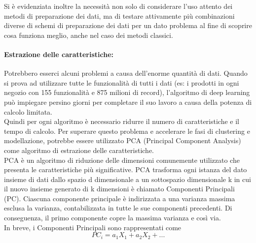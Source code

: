 \documentclass[12pt,a4paper]{report}
\begin{document}
Si è evidenziata inoltre la necessità non solo di considerare l'uso attento dei metodi di preparazione dei dati, ma di testare attivamente più combinazioni diverse di schemi di preparazione dei dati per un dato problema al fine di scoprire cosa funziona meglio, anche nel caso dei metodi classici.\\

\paragraph*{Estrazione delle caratteristiche:}
Potrebbero esserci alcuni problemi a causa dell'enorme quantità di dati. Quando si prova ad utilizzare tutte le funzionalità di tutti i dati (es: i prodotti in ogni negozio con 155 funzionalità e 875 milioni di record), l'algoritmo di deep learning può impiegare persino giorni per completare il suo lavoro a causa della potenza di calcolo limitata. \cite{kilimci2019improved}\\
Quindi per ogni algoritmo è necessario ridurre il numero di caratteristiche e il tempo di calcolo. Per superare questo problema e accelerare le fasi di clustering e modellazione, potrebbe essere utilizzato PCA (Principal Component Analysis) come algoritmo di estrazione delle caratteristiche.\\
PCA è un algoritmo di riduzione delle dimensioni comunemente utilizzato che presenta le caratteristiche più significative. PCA trasforma ogni istanza del dato insieme di dati dallo spazio d dimensionale a un sottospazio dimensionale k in cui il nuovo insieme generato di k dimensioni è chiamato Componenti Principali (PC). Ciascuna componente principale è indirizzata a una varianza massima esclusa la varianza, contabilizzata in tutte le sue componenti precedenti. Di conseguenza, il primo componente copre la massima varianza e così via.\\
In breve, i Componenti Principali sono rappresentati come
\begin{equation}
    {\displaystyle PC_i = a_1X_1 + a_2X_2 + ...}
\end{equation}
\end{document}
